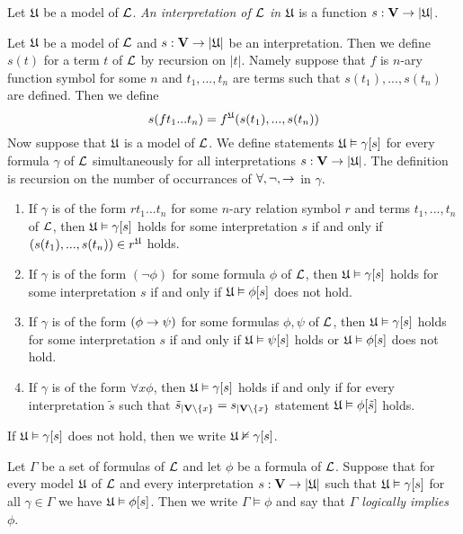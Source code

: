 \begin{definition}
Let ${\mathfrak U}$ be a model of ${\mathcal L}$. \textit{An interpretation of ${\mathcal L}$ in ${\mathfrak U}$} is a function $s:\mathbf{V}\rightarrow |{\mathfrak U}|$.
\end{definition}
\noindent
Let ${\mathfrak U}$ be a model of ${\mathcal L}$ and $s:\mathbf{V}\rightarrow |{\mathfrak U}|$ be an interpretation. Then we define $s(t)$ for a term $t$ of ${\mathcal L}$ by recursion on $|t|$. Namely suppose that $f$ is $n$-ary function symbol for some $n$ and $t_1, ..., t_n$ are terms such that $s(t_1),...,s(t_n)$ are defined. Then we define
$$s(ft_1...t_n)= f^{{\mathfrak U}}(s(t_1),...,s(t_n))$$
Now suppose that ${\mathfrak U}$ is a model of ${\mathcal L}$. We define statements ${\mathfrak U} \vDash \gamma[s]$ for every formula $\gamma$ of ${\mathcal L}$ simultaneously for all interpretations $s:\mathbf{V} \rightarrow |{\mathfrak U}|$. The definition is recursion on the number of occurrances of $\forall, \neg, \rightarrow$ in $\gamma$.
\begin{enumerate}[label=\textbf{(\arabic*)}, leftmargin=3.0em]
\item If $\gamma$ is of the form $rt_1 ...t_n$ for some $n$-ary relation symbol $r$ and terms $t_1,...,t_n$ of ${\mathcal L}$, then ${\mathfrak U} \vDash \gamma[s]$ holds for some interpretation $s$ if and only if $\left(s(t_1),...,s(t_n)\right) \in r^{\mathfrak U}$ holds.
\item If $\gamma$ is of the form $(\neg \phi)$ for some formula $\phi$ of ${\mathcal L}$, then ${\mathfrak U} \vDash \gamma[s]$ holds for some interpretation $s$ if and only if ${\mathfrak U} \vDash \phi[s]$ does not hold.
\item If $\gamma$ is of the form $(\phi \rightarrow \psi)$ for some formulas $\phi, \psi$ of ${\mathcal L}$, then ${\mathfrak U} \vDash \gamma[s]$ holds for some interpretation $s$ if and only if ${\mathfrak U} \vDash \psi[s]$ holds or ${\mathfrak U} \vDash \phi[s]$ does not hold.
\item If $\gamma$ is of the form $\forall x \phi$, then ${\mathfrak U} \vDash \gamma[s]$ holds if and only if for every interpretation $\tilde{s}$ such that $\tilde{s}_{\mid \mathbf{V}\setminus \{x\}} = s_{\mid \mathbf{V}\setminus \{x\}}$ statement ${\mathfrak U} \vDash \phi[\tilde{s}]$ holds.
\end{enumerate}
If ${\mathfrak U} \vDash \gamma[s]$ does not hold, then we write ${\mathfrak U} \nvDash \gamma[s]$.

\begin{definition}
Let $\Gamma$ be a set of formulas of ${\mathcal L}$ and let $\phi$ be a formula of ${\mathcal L}$. Suppose that for every model ${\mathfrak U}$ of ${\mathcal L}$ and every interpretation $s:\mathbf{V} \rightarrow |{\mathfrak U}|$ such that ${\mathfrak U} \vDash \gamma[s]$ for all $\gamma \in \Gamma$ we have ${\mathfrak U} \vDash \phi[s]$. Then we write $\Gamma \vDash \phi$ and say that \textit{$\Gamma$ logically implies $\phi$}.
\end{definition}

